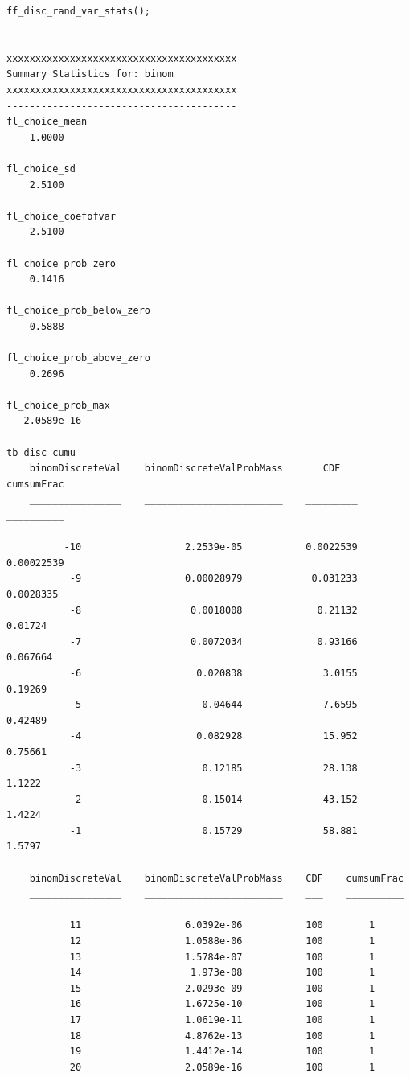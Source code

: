 \documentclass[
]{book}
\begin{document}
\begin{verbatim}
ff_disc_rand_var_stats();

----------------------------------------
xxxxxxxxxxxxxxxxxxxxxxxxxxxxxxxxxxxxxxxx
Summary Statistics for: binom
xxxxxxxxxxxxxxxxxxxxxxxxxxxxxxxxxxxxxxxx
----------------------------------------
fl_choice_mean
   -1.0000

fl_choice_sd
    2.5100

fl_choice_coefofvar
   -2.5100

fl_choice_prob_zero
    0.1416

fl_choice_prob_below_zero
    0.5888

fl_choice_prob_above_zero
    0.2696

fl_choice_prob_max
   2.0589e-16

tb_disc_cumu
    binomDiscreteVal    binomDiscreteValProbMass       CDF       cumsumFrac
    ________________    ________________________    _________    __________

          -10                  2.2539e-05           0.0022539    0.00022539
           -9                  0.00028979            0.031233     0.0028335
           -8                   0.0018008             0.21132       0.01724
           -7                   0.0072034             0.93166      0.067664
           -6                    0.020838              3.0155       0.19269
           -5                     0.04644              7.6595       0.42489
           -4                    0.082928              15.952       0.75661
           -3                     0.12185              28.138        1.1222
           -2                     0.15014              43.152        1.4224
           -1                     0.15729              58.881        1.5797

    binomDiscreteVal    binomDiscreteValProbMass    CDF    cumsumFrac
    ________________    ________________________    ___    __________

           11                  6.0392e-06           100        1     
           12                  1.0588e-06           100        1     
           13                  1.5784e-07           100        1     
           14                   1.973e-08           100        1     
           15                  2.0293e-09           100        1     
           16                  1.6725e-10           100        1     
           17                  1.0619e-11           100        1     
           18                  4.8762e-13           100        1     
           19                  1.4412e-14           100        1     
           20                  2.0589e-16           100        1     


\end{verbatim}
\end{document}
